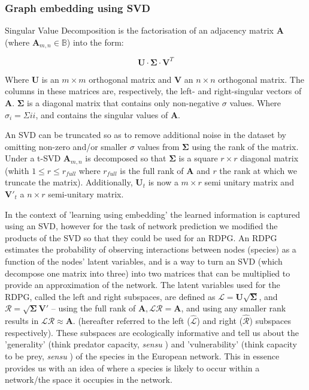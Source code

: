 \subsubsection{Graph embedding using SVD}

Singular Value Decomposition \cite{Forsythe1967ComSol, Golub1971SinVal} 
is the factorisation of an adjacency matrix \(\mathbf{A}\) (where
\(\mathbf{A}_{m,n} \in\mathbb{B}\)) into the form:

\[ \mathbf{U}\cdot\mathbf{\Sigma}\cdot\mathbf{V}^T \]

Where \(\mathbf{U}\) is an \(m \times m\) orthogonal matrix and
\(\mathbf{V}\) an \(n \times n\) orthogonal matrix. The columns in these
matrices are, respectively, the left- and right-singular vectors of
\(\mathbf{A}\). \(\mathbf{\Sigma}\) is a diagonal matrix that contains
only non-negative \(\sigma\) values. Where \(\sigma_{i} = \Sigma{ii}\),
and contains the singular values of \(\mathbf{A}\).
 
An SVD can be truncated so as to remove additional noise in the dataset by
omitting non-zero and/or smaller \(\sigma\) values from
\(\mathbf{\Sigma}\) using the rank of the matrix. Under a t-SVD
\(\mathbf{A}_{m,n}\) is decomposed so that \(\mathbf{\Sigma}\) is a
square \(r \times r\) diagonal matrix (whith \(1 \le r \le r_{full}\)
where \(r_{full}\) is the full rank of \(\mathbf{A}\) and \(r\) the rank
at which we truncate the matrix). Additionally, \(\mathbf{U}_{t}\) is now a
\(m \times r\) semi unitary matrix and \(\mathbf{V}'_{t}\) a \(n \times r\)
semi-unitary matrix.

In the context of 'learning using embedding' the learned information is
captured using an SVD, however for the task of network prediction we modified
the products of the SVD so that they could be used for an RDPG. An RDPG 
estimates the probability of observing interactions between
nodes (species) as a function of the nodes' latent variables, and is a
way to turn an SVD (which decompose one matrix into three) into two
matrices that can be multiplied to provide an approximation of the
network. The latent variables used for the RDPG, called the left and
right subspaces, are defined as
$\mathscr{L} = \mathbf{U}\sqrt{\mathbf{\Sigma}}$, and
$\mathscr{R} = \sqrt{\mathbf{\Sigma}}\mathbf{V}'$ -- using the full
rank of $\mathbf{A}, \mathscr{L}\mathscr{R} = \mathbf{A}$, and
using any smaller rank results in
$\mathscr{L}\mathscr{R} \approx \mathbf{A}$. 
(hereafter referred to the left ($\hat{\mathscr{L}}$) and right 
($\hat{\mathscr{R}}$) subspaces respectively). These
subspaces are ecologically informative and tell us about the 'generality'
(think predator capacity, \emph{sensu} \cite{Schoener1989Food}) and 
'vulnerability' (think capacity to be prey, \emph{sensu} \cite{Schoener1989Food})
of the species in the European network. This in essence provides us with
an idea of where a species is likely to occur within a network/the space
it occupies in the network.

